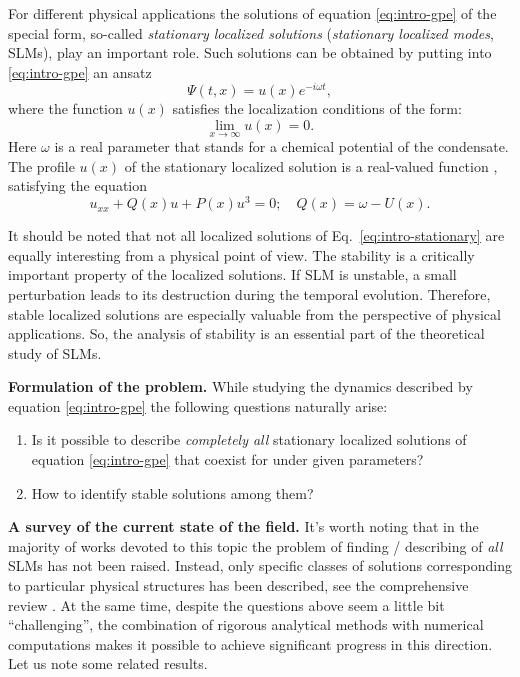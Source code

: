 For different physical applications the solutions of equation \eqref{eq:intro-gpe} of the special form, so-called {\it stationary localized solutions} ({\it stationary localized modes}, SLMs), play an important role.
Such solutions can be obtained by putting into \eqref{eq:intro-gpe} an ansatz
\begin{equation}
	\Psi(t, x) = u(x) e^{-i \omega t},
\label{eq:intro-ansatz}
\end{equation}
where the function $u(x)$ satisfies the localization conditions of the form:
\begin{equation}
	\lim \limits_{x \to \infty} u(x) = 0.
\label{eq:intro-localization}
\end{equation}
Here $\omega$ is a real parameter that stands for a chemical potential of the condensate.
The profile $u(x)$ of the stationary localized solution is a real-valued function \cite{AlfimovKonotopSalerno}, satisfying the equation
\begin{equation}
	u_{xx} + Q(x) u + P(x) u^3 = 0; \quad Q(x) = \omega - U(x).
\label{eq:intro-stationary}
\end{equation}

It should be noted that not all localized solutions of Eq.~\eqref{eq:intro-stationary} are equally interesting from a physical point of view.
The stability is a critically important property of the localized solutions.
If SLM is unstable, a small perturbation leads to its destruction during the temporal evolution.
Therefore, stable localized solutions are especially valuable from the perspective of physical applications.
So, the analysis of stability is an essential part of the theoretical study of SLMs.

\textbf{Formulation of the problem.}
While studying the dynamics described by equation \eqref{eq:intro-gpe} the following questions naturally arise:
\begin{enumerate}
	\item Is it possible to describe {\it completely all} stationary localized solutions of equation \eqref{eq:intro-gpe} that coexist for under given parameters?
	\item How to identify stable solutions among them?
\end{enumerate}

\textbf{A survey of the current state of the field.}
It's worth noting that in the majority of works devoted to this topic the problem of finding / describing of {\it all} SLMs has not been raised.
Instead, only specific classes of solutions corresponding to particular physical structures has been described, see the comprehensive review \cite{KartashovMalomedTorner}.
At the same time, despite the questions above seem a little bit ``challenging'', the combination of rigorous analytical methods with numerical computations makes it possible to achieve significant progress in this direction.
Let us note some related results.

